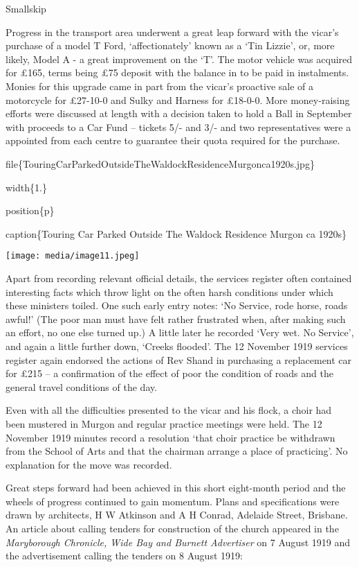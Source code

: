 Smallskip

Progress in the transport area underwent a great leap forward with the vicar's purchase of a model T Ford, `affectionately' known as a `Tin Lizzie', or, more likely, Model A - a great improvement on the `T'. The motor vehicle was acquired for £165, terms being £75 deposit with the balance in to be paid in instalments. Monies for this upgrade came in part from the vicar's proactive sale of a motorcycle for £27-10-0 and Sulky and Harness for £18-0-0. More money-raising efforts were discussed at length with a decision taken to hold a Ball in September with proceeds to a Car Fund -- tickets 5/- and 3/- and two representatives were a appointed from each centre to guarantee their quota required for the purchase.

file\{TouringCarParkedOutsideTheWaldockResidenceMurgonca1920s.jpg\}

width\{1.\}

position\{p\}

caption\{Touring Car Parked Outside The Waldock Residence Murgon ca 1920s\}

\texttt{[image: media/image11.jpeg]}

Apart from recording relevant official details, the services register often contained interesting facts which throw light on the often harsh conditions under which these ministers toiled. One such early entry notes: `No Service, rode horse, roads awful!' (The poor man must have felt rather frustrated when, after making such an effort, no one else turned up.) A little later he recorded `Very wet. No Service', and again a little further down, `Creeks flooded'. The 12 November 1919 services register again endorsed the actions of Rev Shand in purchasing a replacement car for £215 -- a confirmation of the effect of poor the condition of roads and the general travel conditions of the day.

Even with all the difficulties presented to the vicar and his flock, a choir had been mustered in Murgon and regular practice meetings were held. The 12 November 1919 minutes record a resolution `that choir practice be withdrawn from the School of Arts and that the chairman arrange a place of practicing'. No explanation for the move was recorded.

Great steps forward had been achieved in this short eight-month period and the wheels of progress continued to gain momentum. Plans and specifications were drawn by architects, H W Atkinson and A H Conrad, Adelaide Street, Brisbane. An article about calling tenders for construction of the church appeared in the \emph{Maryborough Chronicle, Wide Bay and Burnett Advertiser} on 7 August 1919 and the advertisement calling the tenders on 8 August 1919:


